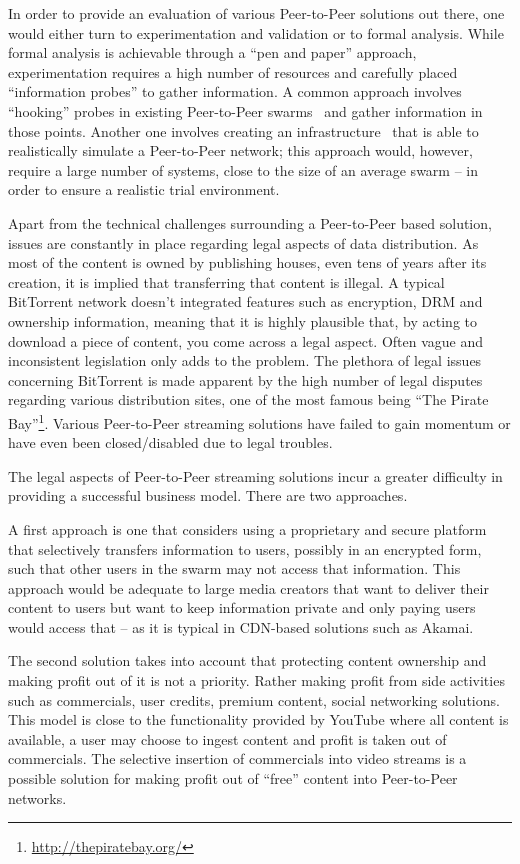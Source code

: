 In order to provide an evaluation of various Peer-to-Peer solutions out there,
one would either turn to experimentation and validation or to formal
analysis. While formal analysis is achievable through a ``pen and paper''
approach, experimentation requires a high number of resources and carefully
placed ``information probes'' to gather information. A common approach
involves ``hooking'' probes in existing Peer-to-Peer
swarms~\cite{corr-overlay} and gather
information in those points. Another one involves creating an
infrastructure~\cite{bt-vi}
that is able to realistically simulate a Peer-to-Peer network; this approach
would, however, require a large number of systems, close to the size of an
average swarm -- in order to ensure a realistic trial environment.

Apart from the technical challenges surrounding a Peer-to-Peer based solution,
issues are constantly in place regarding legal aspects of data distribution.
As most of the content is owned by publishing houses, even tens of years after
its creation, it is implied that transferring that content is illegal. A
typical BitTorrent network doesn't integrated features such as encryption, DRM
and ownership information, meaning that it is highly plausible that, by acting
to download a piece of content, you come across a legal aspect. Often vague
and inconsistent legislation only adds to the problem. The plethora of legal
issues concerning BitTorrent is made apparent by the high number of legal
disputes regarding various distribution sites, one of the most famous being
``The Pirate Bay''\footnote{\url{http://thepiratebay.org/}}. Various Peer-to-Peer
streaming solutions have failed to gain momentum or have even been
closed/disabled due to legal troubles.

The legal aspects of Peer-to-Peer streaming solutions incur a greater
difficulty in providing a successful business model. There are two approaches.

A first approach is one that considers using a proprietary and secure platform
that selectively transfers information to users, possibly in an encrypted
form, such that other users in the swarm may not access that information. This
approach would be adequate to large media creators that want to deliver their
content to users but want to keep information private and only paying users
would access that -- as it is typical in CDN-based solutions such as Akamai.

The second solution takes into account that protecting content ownership and
making profit out of it is not a priority. Rather making profit from side
activities such as commercials, user credits, premium content, social
networking solutions. This model is close to the functionality provided by
YouTube where all content is available, a user may choose to ingest content
and profit is taken out of commercials. The selective insertion of commercials
into video streams is a possible solution for making profit out of ``free''
content into Peer-to-Peer networks.

